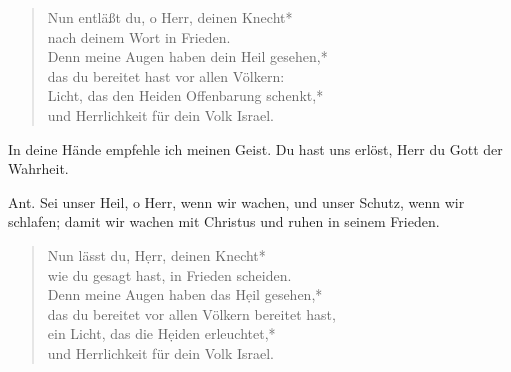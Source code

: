 \begin{verse}

Nun entläßt du, o Herr, deinen Knecht*\\
nach deinem Wort in Frieden.\\
\vin Denn meine Augen haben dein Heil gesehen,*\\
\vin das du bereitet hast vor allen Völkern:\\
Licht, das den Heiden Offenbarung schenkt,*\\
und Herrlichkeit für dein Volk Israel.\\

\end{verse}



\resp
{}

In deine Hände empfehle ich meinen Geist. Du hast uns erlöst, Herr du Gott der Wahrheit.


\vspace{0.6cm}

\resptp


\vspace{0.6cm}

\def\greinitialformat#1{{\fontsize{40}{40}\selectfont #1}}
\gresetfirstlineaboveinitial{\small \textcolor{red}{Nunc dim}}{}
\setaboveinitialseparation{0.72mm}


Ant. Sei unser Heil, o Herr, wenn wir wachen, und unser Schutz,
wenn wir schlafen; damit wir wachen mit Christus und ruhen in seinem Frieden.

\vspace{0.3cm}

\begin{verse}
 
Nun lässt du,  H\d err, deinen Knecht*\\
wie du gesagt hast, in Frieden scheiden.\\
\vin Denn meine Augen haben das H\d eil gesehen,*\\
\vin das du bereitet vor allen Völkern bereitet hast,\\
ein Licht, das die H\d eiden erleuchtet,*\\
und Herrlichkeit für dein Volk Israel.\\
\end{verse}





